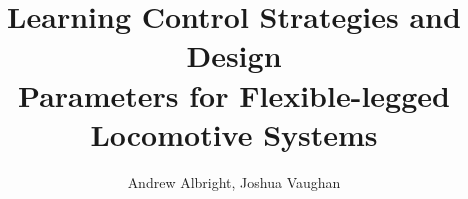 \documentclass[final]{beamer}
\title{Learning Control Strategies and Design \\ Parameters for Flexible-legged Locomotive Systems} %
\author{Andrew Albright, Joshua Vaughan} %
\institute{andrew.albright1@louisiana.edu} %
\newlength{\sepwid}
\newlength{\onecolwid}
\begin{document}

\setlength{\belowcaptionskip}{2ex} %
\setlength\belowdisplayshortskip{2ex} %

\begin{frame}[t] %

\begin{columns}[t] %

\begin{column}{\sepwid}\end{column} %

\begin{column}{\onecolwid} %

%
%
%



\end{column}
\end{columns}
\end{frame}
\end{document}
